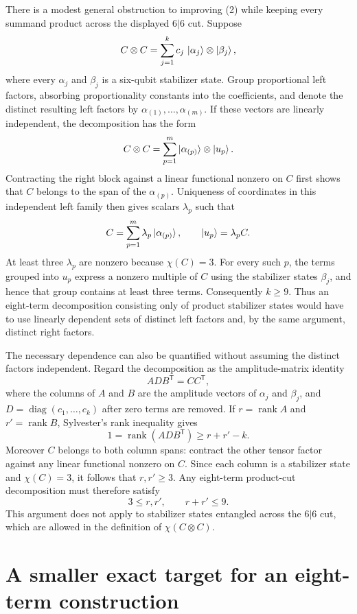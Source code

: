 \documentclass[11pt]{article}
\theoremstyle{definition}
\begin{document}
There is a modest general obstruction to improving (2) while keeping every summand product across the displayed $6|6$ cut. Suppose
\[
C\otimes C=\sum_{j=1}^k c_j\,\ket{\alpha_j}\otimes\ket{\beta_j},
\]
where every $\alpha_j$ and $\beta_j$ is a six-qubit stabilizer state. Group proportional left factors, absorbing proportionality constants into the coefficients, and denote the distinct resulting left factors by $\alpha_{(1)},\ldots,\alpha_{(m)}$. If these vectors are linearly independent, the decomposition has the form
\[
C\otimes C=\sum_{p=1}^m\ket{\alpha_{(p)}}\otimes\ket{u_p}.
\]
Contracting the right block against a linear functional nonzero on $C$ first shows that $C$ belongs to the span of the $\alpha_{(p)}$. Uniqueness of coordinates in this independent left family then gives scalars $\lambda_p$ such that
\[
C=\sum_{p=1}^m\lambda_p\ket{\alpha_{(p)}},
\qquad \ket{u_p}=\lambda_p C.
\]
At least three $\lambda_p$ are nonzero because $\chi(C)=3$. For every such $p$, the terms grouped into $u_p$ express a nonzero multiple of $C$ using the stabilizer states $\beta_j$, and hence that group contains at least three terms. Consequently $k\geq9$. Thus an eight-term decomposition consisting only of product stabilizer states would have to use linearly dependent sets of distinct left factors and, by the same argument, distinct right factors.

The necessary dependence can also be quantified without assuming the distinct factors independent. Regard the decomposition as the amplitude-matrix identity
\[
ADB^{\mathsf T}=CC^{\mathsf T},
\]
where the columns of $A$ and $B$ are the amplitude vectors of $\alpha_j$ and $\beta_j$, and $D=\operatorname{diag}(c_1,\ldots,c_k)$ after zero terms are removed. If $r=\operatorname{rank}A$ and $r'=\operatorname{rank}B$, Sylvester's rank inequality gives
\[
1=\operatorname{rank}(ADB^{\mathsf T})\geq r+r'-k.
\]
Moreover $C$ belongs to both column spans: contract the other tensor factor against any linear functional nonzero on $C$. Since each column is a stabilizer state and $\chi(C)=3$, it follows that $r,r'\geq3$. Any eight-term product-cut decomposition must therefore satisfy
\[
3\leq r,r',\qquad r+r'\leq9.
\]
This argument does not apply to stabilizer states entangled across the $6|6$ cut, which are allowed in the definition of $\chi(C\otimes C)$.

\section{A smaller exact target for an eight-term construction}
\end{document}
